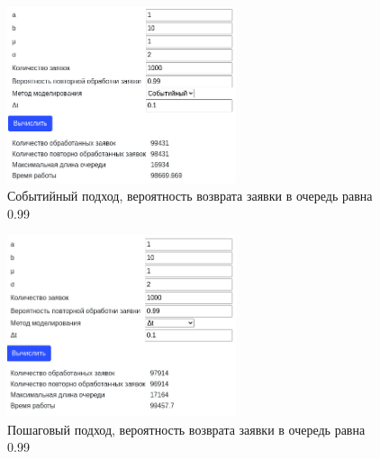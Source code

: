 \begin{figure}[H]
    \centering
    \includegraphics[width=0.6\textwidth]{images/scr09.png}
    \caption{Событийный подход, вероятность возврата заявки в очередь равна 0.99}
\end{figure}
\begin{figure}[H]
    \centering
    \includegraphics[width=0.6\textwidth]{images/scr10.png}
    \caption{Пошаговый подход, вероятность возврата заявки в очередь равна 0.99}
\end{figure}
